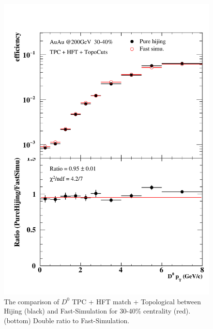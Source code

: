 \begin{figure}[htbp]
\begin{minipage}[htbp]{0.47\linewidth}
\centering
\includegraphics[width=1.0\textwidth,angle=0]{figure/Run14_D0HFT/30_40.pdf}
\caption{ The comparison of $D^0$ TPC + HFT match + Topological between Hijing (black) and Fast-Simulation for 30-40\% centrality (red). (bottom) Double ratio to Fast-Simulation.\label{30_40}}
\end{minipage}
\hfill
\begin{minipage}[htbp]{0.47\linewidth}
\centering

\end{minipage}
\end{figure}
